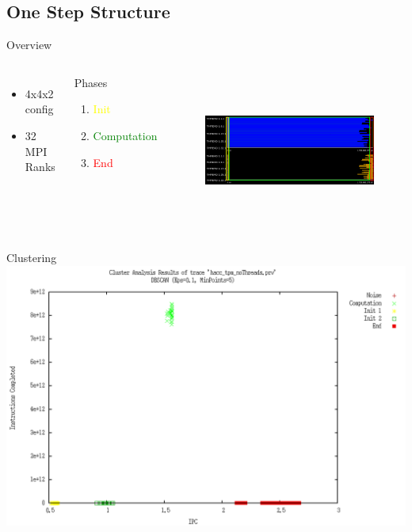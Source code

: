 \documentclass[aspectratio=169]{bredelebeamer}
\begin{document}
\subsection{One Step Structure}
\begin{frame}{Overview}

\begin{columns}[c]


	\begin{itemize}
	\item 4x4x2 config
	\item 32 MPI Ranks
	\end{itemize}
	\begin{block}{Phases}
		\begin{enumerate}						
		\item \textcolor{yellow}{ Init}
		\item \textcolor{Green}{Computation}
		\item \textcolor{red}{End}
		\end{enumerate}	
	\end{block}
 



\begin{figure}[h!]
  \centering
    \includegraphics[width=\textwidth,height=5cm,keepaspectratio]{"./img/one_step/phases"}
\end{figure}

\end{columns}
\end{frame}


\begin{frame}{Clustering}
\includegraphics[width=\textwidth, keepaspectratio=1]{"./img/one_step/clustering"}


\end{frame}
\end{document}

